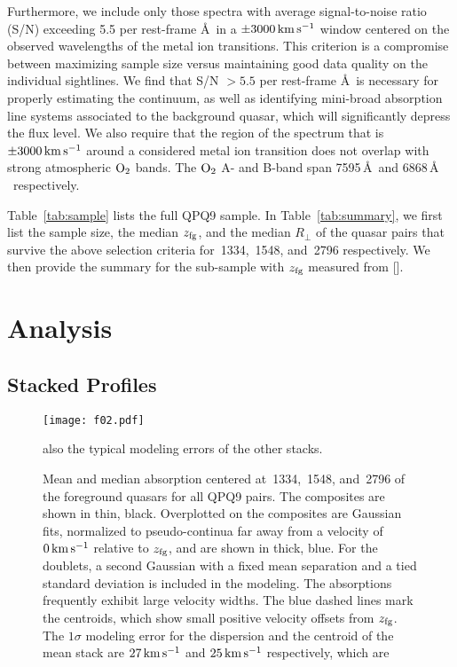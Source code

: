\documentclass[iop]{emulateapj}
\begin{document}
Furthermore, we include only those spectra with average signal-to-noise ratio (S/N) exceeding 5.5
per rest-frame \AA\ in a $\pm3000\,{\rm km\,s^{-1}}$ window centered on the observed wavelengths
of the metal ion transitions. This criterion is a compromise between maximizing sample size versus
maintaining good data quality on the individual sightlines. We find that S/N $>5.5$ per rest-frame
\AA\ is necessary for properly estimating the continuum, as well as identifying mini-broad
absorption line systems associated to the background quasar, which will significantly depress the
flux level. We also require that the region of the spectrum that is $\pm3000\,{\rm km\,s^{-1}}$
around a considered metal ion transition does not overlap with strong atmospheric ${\rm O}_2$
bands. The ${\rm O}_2$ A- and B-band span 7595\,\AA \ and 6868\,\AA
\ respectively.

Table~\ref{tab:sample} lists the full QPQ9 sample. In Table~\ref{tab:summary}, we first list the
sample size, the median $z_{\rm fg}$, and the median $R_\perp$ of the quasar pairs that survive
the above selection criteria for \,1334, \,1548, and \,2796
respectively. We then provide the summary for the sub-sample with $z_{\rm fg}$ measured from
[].

\section{Analysis}
\label{sec:analysis}

\subsection{Stacked Profiles}
\label{sec:stacks}

\begin{figure}
\texttt{[image: f02.pdf]}
\caption{Mean and median absorption centered at \,1334, \,1548, and
\,2796 of the foreground quasars for all QPQ9 pairs. The composites are shown in thin,
black. Overplotted on the composites are Gaussian fits, normalized to pseudo-continua far away
from a velocity of $0\,{\rm km\,s^{-1}}$ relative to $z_{\rm fg}$, and are shown in thick, blue.
For the doublets, a second Gaussian with a fixed mean separation and a tied standard deviation is
included in the modeling. The absorptions frequently exhibit large velocity widths. The blue dashed
lines mark the centroids, which show small positive velocity offsets from $z_{\rm fg}$. The
$1\sigma$ modeling error for the
dispersion and the centroid of the  mean stack are $27\,{\rm km\,s^{-1}}$ and
$25\,{\rm km\,s^{-1}}$ respectively, which are}
also the typical modeling errors of the other stacks.
\label{fig:stacks_and_fits}
\end{figure}
\end{document}
